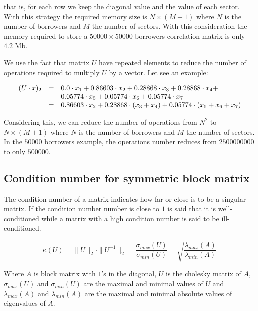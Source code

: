 \documentclass[a4paper,12pt,final]{article}
\begin{document}
that is, for each row we keep the diagonal value and the value of each sector. 
With this strategy the required memory size is $N \times (M+1)$ where $N$ is
the number of borrowers and $M$ the number of sectors. With this consideration
the memory required to store a $50000 \times 50000$ borrowers correlation matrix
is only $4.2$ Mb.
\newline

We use the fact that matrix $U$ have repeated elements to reduce the number of 
operations required to multiply $U$ by a vector. Let see an example:

\begin{displaymath}
\begin{array}{rcl}
(U \cdot x)_2 & = & 0.0 \cdot x_1 + 0.86603 \cdot x_2 + 0.28868 \cdot x_3 + 0.28868 \cdot x_4 + \cr
              &   & 0.05774 \cdot x_5 + 0.05774 \cdot x_6 + 0.05774 \cdot x_7 \cr
              & = & 0.86603 \cdot x_2 + 0.28868 \cdot (x_3 + x_4) + 0.05774 \cdot (x_5 + x_6 + x_7)
\end{array}
\end{displaymath}

Considering this, we can reduce the number of operations from $N^2$ to 
$N \times (M+1)$ where $N$ is the number of borrowers and $M$ the number of 
sectors. In the $50000$ borrowers example, the operations number reduces from 
$2500000000$ to only $500000$.

\subsection{Condition number for symmetric block matrix}
\label{ap:condnum}

The condition number of a matrix indicates how far or close is to be a singular 
matrix. If the condition number number is close to $1$ is said that it is 
well-conditioned while a matrix with a high condition number is said to be 
ill-conditioned.

\begin{displaymath}
\kappa(U) = \|U\|_2 \cdot \|U^{-1}\|_2 
= \frac{\sigma_{max}(U)}{\sigma_{min}(U)}
= \sqrt{\frac{\lambda_{max}(A)}{\lambda_{min}(A)}}
\end{displaymath}

Where $A$ is block matrix with $1$'s in the diagonal, $U$ is the cholesky 
matrix of $A$, $\sigma_{max}(U)$ and $\sigma_{min}(U)$ are the maximal and
minimal values of $U$ and $\lambda_{max}(A)$ and $\lambda_{min}(A)$ are 
the maximal and minimal absolute values of eigenvalues of $A$.
\end{document}

